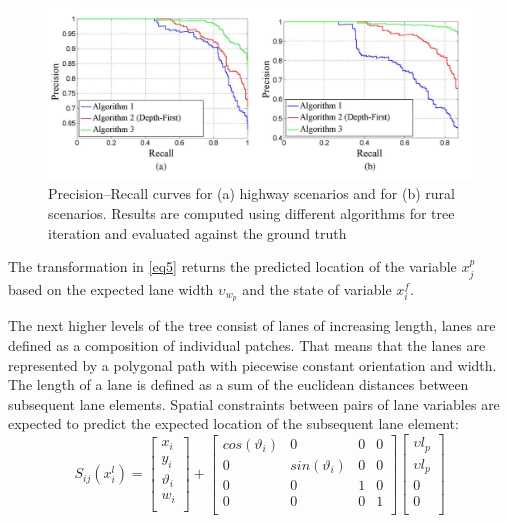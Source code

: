 \begin{figure}[H]
	\centering
    \includegraphics[scale = 0.4]{pictures/roc.pdf}
	\caption{Precision–Recall curves for (a) highway scenarios and for (b) rural scenarios. Results are computed using different algorithms for tree iteration and evaluated against the ground truth\cite{lanesystem}}
	\label{fig12}
\end{figure}


The transformation in \ref{eq5} returns the predicted location of the variable $x_j^p$ based on the expected lane width $\upsilon_{w_p}$ and the state of variable $x_i^f$. 

The next higher levels of the tree consist of lanes of increasing length, lanes are defined as a composition of individual patches. That means that the lanes are represented by a polygonal path with piecewise constant orientation and width. The length of a lane is defined as a sum of the euclidean distances between subsequent lane elements. Spatial constraints between pairs of lane variables are expected to predict the expected location of the subsequent lane element:
\begin{equation}
S_{ij}(x_i^l) = \begin{bmatrix}
x_i \\
y_i \\
\vartheta_i \\
w_i \\
\end{bmatrix} +
\begin{bmatrix}
cos(\vartheta_i) & 0 & 0 & 0 \\
0 & sin(\vartheta_i) & 0 & 0 \\
0 & 0 & 1 & 0\\
0 & 0 & 0 & 1 \\
\end{bmatrix}
\begin{bmatrix}
\upsilon l_p \\
\upsilon l_p \\
0 \\
0 \\
\end{bmatrix}
\end{equation}

